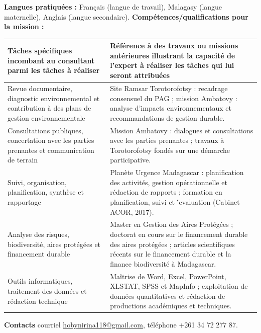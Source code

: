 \documentclass[10pt,a4paper]{article}
\newcommand{\fieldlabel}[1]{\textbf{#1}}
\begin{document}
\vspace{0.55em}
\fieldlabel{\large Langues pratiqu\'ees  :} Fran\c cais (langue de travail), Malagasy (langue maternelle), Anglais (langue secondaire).
\vspace{0.65em}
\vspace{0.15em}
\fieldlabel{\large Comp\'etences/qualifications pour la mission :}

\vspace{0.3em}
{\footnotesize
\begin{tabularx}{\textwidth}{|L{7.2cm}|Y|}
\hline
{}\textbf{T\^aches sp\'ecifiques incombant au consultant parmi les t\^aches \`a r\'ealiser} & \textbf{R\'ef\'erence \`a des travaux ou missions ant\'erieures illustrant la capacit\'e de l'expert \`a r\'ealiser les t\^aches qui lui seront attribu\'ees} \\\hline
Revue documentaire, diagnostic environnemental et contribution \`a des plans de gestion environnementale & Site Ramsar Torotorofotsy : recadrage consensuel du PAG ; mission Ambatovy : analyse d'impacts environnementaux et recommandations de gestion durable. \\\hline
Consultations publiques, concertation avec les parties prenantes et communication de terrain & Mission Ambatovy : dialogues et consultations avec les parties prenantes ; travaux \`a Torotorofotsy fond\'es sur une d\'emarche participative. \\\hline
Suivi, organisation, planification, synth\`ese et rapportage & Plan\`ete Urgence Madagascar : planification des activit\'es, gestion op\'erationnelle et r\'edaction de rapports ; formation en planification, suivi et \''evaluation (Cabinet ACOR, 2017). \\\hline
Analyse des risques, biodiversit\'e, aires prot\'eg\'ees et financement durable & Master en Gestion des Aires Prot\'eg\'ees ; doctorat en cours sur le financement durable des aires prot\'eg\'ees ; articles scientifiques r\'ecents sur le financement durable et la finance biodiversit\'e \`a Madagascar. \\\hline
Outils informatiques, traitement des donn\'ees et r\'edaction technique & Ma\^itrise de Word, Excel, PowerPoint, XLSTAT, SPSS et MapInfo ; exploitation de donn\'ees quantitatives et r\'edaction de productions acad\'emiques et techniques. \\\hline
\end{tabularx}
}

\vspace{0.55em}
\fieldlabel{\large Contacts} courriel \url{hobynirina118@gmail.com}, t\'el\'ephone +261 34 72 277 87.
\end{document}
